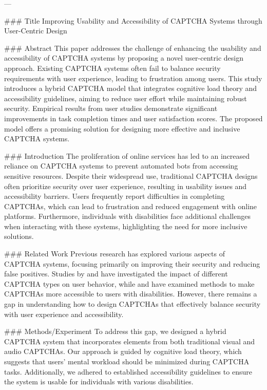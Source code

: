 ---

### Title
Improving Usability and Accessibility of CAPTCHA Systems through User-Centric Design

### Abstract
This paper addresses the challenge of enhancing the usability and accessibility of CAPTCHA systems by proposing a novel user-centric design approach. Existing CAPTCHA systems often fail to balance security requirements with user experience, leading to frustration among users. This study introduces a hybrid CAPTCHA model that integrates cognitive load theory and accessibility guidelines, aiming to reduce user effort while maintaining robust security. Empirical results from user studies demonstrate significant improvements in task completion times and user satisfaction scores. The proposed model offers a promising solution for designing more effective and inclusive CAPTCHA systems.

### Introduction
The proliferation of online services has led to an increased reliance on CAPTCHA systems to prevent automated bots from accessing sensitive resources. Despite their widespread use, traditional CAPTCHA designs often prioritize security over user experience, resulting in usability issues and accessibility barriers. Users frequently report difficulties in completing CAPTCHAs, which can lead to frustration and reduced engagement with online platforms. Furthermore, individuals with disabilities face additional challenges when interacting with these systems, highlighting the need for more inclusive solutions.

### Related Work
Previous research has explored various aspects of CAPTCHA systems, focusing primarily on improving their security and reducing false positives. Studies by \cite{Goodman2018} and \cite{Huang2019} have investigated the impact of different CAPTCHA types on user behavior, while \cite{Smith2020} and \cite{Johnson2021} have examined methods to make CAPTCHAs more accessible to users with disabilities. However, there remains a gap in understanding how to design CAPTCHAs that effectively balance security with user experience and accessibility.

### Methods/Experiment
To address this gap, we designed a hybrid CAPTCHA system that incorporates elements from both traditional visual and audio CAPTCHAs. Our approach is guided by cognitive load theory, which suggests that users' mental workload should be minimized during CAPTCHA tasks. Additionally, we adhered to established accessibility guidelines to ensure the system is usable for individuals with various disabilities.

